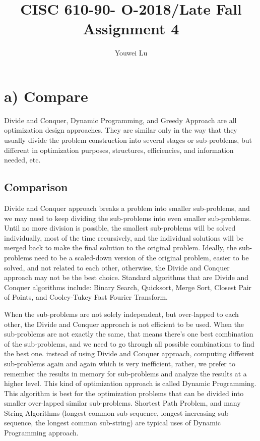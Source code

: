 \documentclass[natbib,12pt]{article}
\title{CISC 610-90- O-2018/Late Fall \linebreak Assignment 4}
\author{Youwei Lu}
\date{}
\begin{document}
	\maketitle
	
	\section*{a) Compare}
	
	Divide and Conquer, Dynamic Programming, and Greedy Approach are all optimization design approaches. They are similar only in the way that they usually divide the problem construction into several stages or sub-problems, but different in optimization purposes, structures, efficiencies, and information needed, etc.
	
	\subsection*{Comparison}
	Divide and Conquer approach breaks a problem into smaller sub-problems, and we may need to keep dividing the sub-problems into even smaller sub-problems. Until no more division is possible, the smallest sub-problems will be solved individually, most of the time recursively, and the individual solutions will be merged back to make the final solution to the original problem. Ideally, the sub-problems need to be a scaled-down version of the original problem, easier to be solved, and not related to each other, otherwise, the Divide and Conquer approach may not be the best choice. Standard algorithms that are Divide and Conquer algorithms include: Binary Search, Quicksort, Merge Sort, Closest Pair of Points, and Cooley-Tukey Fast Fourier Transform.
	
	When the sub-problems are not solely independent, but over-lapped to each other, the Divide and Conquer approach is not efficient to be used. When the sub-problems are not exactly the same, that means there's one best combination of the sub-problems, and we need to go through all possible combinations to find the best one. instead of using Divide and Conquer approach, computing different sub-problems again and again which is very inefficient, rather, we prefer to remember the results in memory for sub-problems and analyze the results at a higher level. This kind of optimization approach is called Dynamic Programming. This algorithm is best for the optimization problems that can be divided into smaller over-lapped similar sub-problems. Shortest Path Problem, and many String Algorithms (longest common sub-sequence, longest increasing sub-sequence, the longest common sub-string) are typical uses of Dynamic Programming approach.
	
\end{document}
